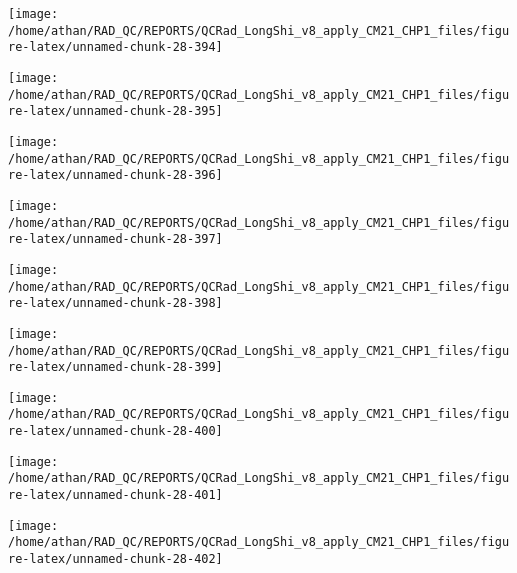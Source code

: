 \documentclass[
  10pt,
  a4paper,oneside]{article}
\begin{document}
\begin{center}\texttt{[image: /home/athan/RAD\_QC/REPORTS/QCRad\_LongShi\_v8\_apply\_CM21\_CHP1\_files/figure-latex/unnamed-chunk-28-394]} \end{center}

\begin{center}\texttt{[image: /home/athan/RAD\_QC/REPORTS/QCRad\_LongShi\_v8\_apply\_CM21\_CHP1\_files/figure-latex/unnamed-chunk-28-395]} \end{center}

\begin{center}\texttt{[image: /home/athan/RAD\_QC/REPORTS/QCRad\_LongShi\_v8\_apply\_CM21\_CHP1\_files/figure-latex/unnamed-chunk-28-396]} \end{center}

\begin{center}\texttt{[image: /home/athan/RAD\_QC/REPORTS/QCRad\_LongShi\_v8\_apply\_CM21\_CHP1\_files/figure-latex/unnamed-chunk-28-397]} \end{center}

\begin{center}\texttt{[image: /home/athan/RAD\_QC/REPORTS/QCRad\_LongShi\_v8\_apply\_CM21\_CHP1\_files/figure-latex/unnamed-chunk-28-398]} \end{center}

\begin{center}\texttt{[image: /home/athan/RAD\_QC/REPORTS/QCRad\_LongShi\_v8\_apply\_CM21\_CHP1\_files/figure-latex/unnamed-chunk-28-399]} \end{center}

\begin{center}\texttt{[image: /home/athan/RAD\_QC/REPORTS/QCRad\_LongShi\_v8\_apply\_CM21\_CHP1\_files/figure-latex/unnamed-chunk-28-400]} \end{center}

\begin{center}\texttt{[image: /home/athan/RAD\_QC/REPORTS/QCRad\_LongShi\_v8\_apply\_CM21\_CHP1\_files/figure-latex/unnamed-chunk-28-401]} \end{center}

\begin{center}\texttt{[image: /home/athan/RAD\_QC/REPORTS/QCRad\_LongShi\_v8\_apply\_CM21\_CHP1\_files/figure-latex/unnamed-chunk-28-402]} \end{center}
\end{document}
